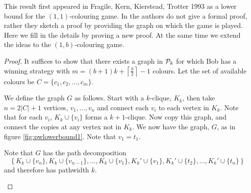 This result first appeared in Fragile, Kern, Kierstead, Trotter 1993 \cite{faKeKiTr1993} as a lower bound for the $(1,1)$-colouring game. In \cite{faKeKiTr1993} the authors do not give a formal proof, rather they sketch a proof by providing the graph on which the game is played. Here we fill in the details by proving a new proof. At the same time we  extend the ideas to the $(1,b)$-colouring game.
\begin{proof}
    It suffices to show that there exists a graph in $\mathcal{P}_k$ for which Bob has a winning strategy with $m=(b+1)k+\left\lceil\frac{b}{2}\right\rceil-1$ colours. Let the set of available colours be $C=\{c_1,c_2,\dots,c_m\}$.
    
    We define the graph $G$ as follows. Start with a $k$-clique, $K_k$, then take $n=2|C|+1$ vertices, $v_1,\dots,v_n$ and connect each $v_i$ to each vertex in $K_k$. Note that for each $v_i$, $K_k\cup\{v_i\}$ forms a $k+1$-clique. Now copy this graph, and connect the copies at any vertex not in $K_k$. We now have the graph, $G$, as in figure \ref{fig:pwlowerbound1}. Note that $v_1=t_1$. 
    
    Note that $G$ has the path decomposition \[\left\{K_k\cup\{v_n\}, K_k\cup\{v_{n-1}\}, \dots, K_k\cup\{v_1\}, K_k'\cup\{v_1\}, K_k'\cup\{t_2\}, \dots, K_k'\cup\{t_n\}\right\}\] and therefore has pathwidth $k$.
\begin{figure}[H]
    \centering
{}
\end{figure}
\end{proof}
